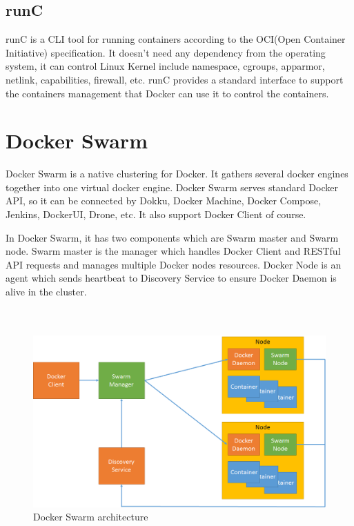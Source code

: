 \subsection{runC}
runC is a CLI tool for running containers according to the OCI(Open Container Initiative) specification. It doesn't need any dependency from the operating system, it can control Linux Kernel include namespace, cgroups, apparmor, netlink, capabilities, firewall, etc.
runC provides a standard interface to support the containers management that Docker can use it to control the containers.

\section{Docker Swarm}
Docker Swarm \cite{DockerSwarm} is a native clustering for Docker. It gathers several docker engines together into  one virtual docker engine. Docker Swarm serves standard Docker API, so it can be connected by Dokku, Docker Machine, Docker Compose, Jenkins, DockerUI, Drone, etc. It also support Docker Client of course.

In Docker Swarm, it has two components which are Swarm master and Swarm node. Swarm master is the manager which handles Docker Client and RESTful API requests and manages multiple Docker nodes resources. Docker Node is an agent which sends heartbeat to Discovery Service to ensure Docker Daemon is alive in the cluster.
\\
\\
\\
\begin{figure}[h]
\begin{center}
\includegraphics[width=15cm]{figure/swarm_docker.png}
\end{center}
\caption{Docker Swarm architecture}
\end{figure}

